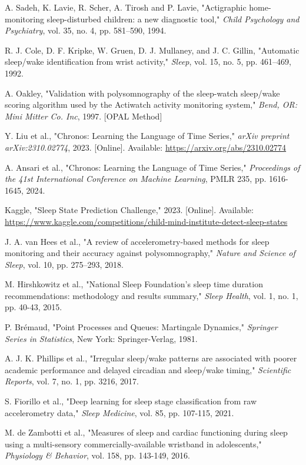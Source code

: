 \documentclass[conference]{IEEEtran}
\begin{document}
\begin{thebibliography}{99}

A. Sadeh, K. Lavie, R. Scher, A. Tirosh and P. Lavie,
"Actigraphic home-monitoring sleep-disturbed children: a new diagnostic tool,"
\textit{Child Psychology and Psychiatry}, vol. 35, no. 4, pp. 581–590, 1994.

R. J. Cole, D. F. Kripke, W. Gruen, D. J. Mullaney, and J. C. Gillin,
"Automatic sleep/wake identification from wrist activity,"
\textit{Sleep}, vol. 15, no. 5, pp. 461–469, 1992.

A. Oakley,
"Validation with polysomnography of the sleep-watch sleep/wake scoring algorithm used by the Actiwatch activity monitoring system,"
\textit{Bend, OR: Mini Mitter Co. Inc}, 1997. [OPAL Method]

Y. Liu et al., "Chronos: Learning the Language of Time Series," 
\textit{arXiv preprint arXiv:2310.02774}, 2023. [Online]. Available: \url{https://arxiv.org/abs/2310.02774}

A. Ansari et al., "Chronos: Learning the Language of Time Series,"
\textit{Proceedings of the 41st International Conference on Machine Learning}, PMLR 235, pp. 1616-1645, 2024.

Kaggle, "Sleep State Prediction Challenge," 2023. [Online]. Available: \url{https://www.kaggle.com/competitions/child-mind-institute-detect-sleep-states}

J. A. van Hees et al., 
"A review of accelerometry-based methods for sleep monitoring and their accuracy against polysomnography,"
\textit{Nature and Science of Sleep}, vol. 10, pp. 275–293, 2018.

M. Hirshkowitz et al.,
"National Sleep Foundation's sleep time duration recommendations: methodology and results summary,"
\textit{Sleep Health}, vol. 1, no. 1, pp. 40-43, 2015.

P. Brémaud,
"Point Processes and Queues: Martingale Dynamics,"
\textit{Springer Series in Statistics}, New York: Springer-Verlag, 1981.

A. J. K. Phillips et al.,
"Irregular sleep/wake patterns are associated with poorer academic performance and delayed circadian and sleep/wake timing,"
\textit{Scientific Reports}, vol. 7, no. 1, pp. 3216, 2017.

S. Fiorillo et al.,
"Deep learning for sleep stage classification from raw accelerometry data,"
\textit{Sleep Medicine}, vol. 85, pp. 107-115, 2021.

M. de Zambotti et al.,
"Measures of sleep and cardiac functioning during sleep using a multi-sensory commercially-available wristband in adolescents,"
\textit{Physiology \& Behavior}, vol. 158, pp. 143-149, 2016.

\end{thebibliography}
\end{document}
